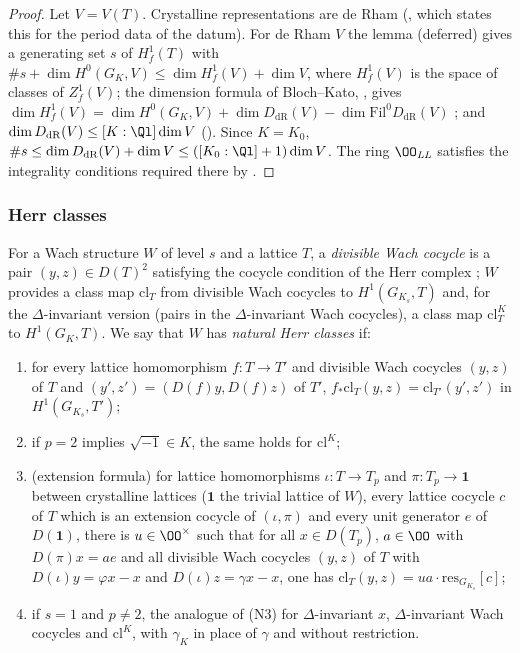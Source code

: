 \begin{proof}
Let $V=V(T)$. Crystalline representations are de Rham (, which states this for the
period data of the datum). For de Rham $V$ the lemma  (deferred) gives a generating set $s$
of $H^1_f(T)$ with $\#s+\dim H^0(G_K,V)\le\dim H^1_f(V)+\dim V$, where $H^1_f(V)$ is the space of classes of $Z^1_f(V)$; the dimension
formula of Bloch--Kato, , gives
$\dim H^1_f(V)=\dim H^0(G_K,V)+\dim D_{\mathrm{dR}}(V)-\dim\mathrm{Fil}^0D_{\mathrm{dR}}(V)$ \cite{BlochKato1990}; and
$\dim D_{\mathrm{dR}}(V)\le[K:\Ql]\dim V$ (). Since $K=K_0$,
$\#s\le\dim D_{\mathrm{dR}}(V)+\dim V\le([K_0:\Ql]+1)\dim V$. The ring $\OO_{\mathit{LL}}$ satisfies the integrality conditions required
there by .
\end{proof}

\subsubsection{Herr classes}

For a Wach structure $W$ of level $s$ and a lattice $T$, a \emph{divisible Wach cocycle} is a pair $(y,z)\in D(T)^2$ satisfying the cocycle
condition of the Herr complex \cite{Herr1998}; $W$ provides a class map $\mathrm{cl}_T$ from divisible Wach cocycles to
$H^1(G_{K_s},T)$ and, for the $\Delta$-invariant version (pairs in the $\Delta$-invariant Wach cocycles), a class map $\mathrm{cl}^K_T$ to
$H^1(G_K,T)$. We say that $W$ has \emph{natural Herr classes} if:
\begin{enumerate}[label=(N\arabic*)]
\item for every lattice homomorphism $f\colon T\to T'$ and divisible Wach cocycles $(y,z)$ of $T$ and $(y',z')=(D(f)y,D(f)z)$ of $T'$,
$f_*\mathrm{cl}_T(y,z)=\mathrm{cl}_{T'}(y',z')$ in $H^1(G_{K_s},T')$;
\item if $p=2$ implies $\sqrt{-1}\in K$, the same holds for $\mathrm{cl}^K$;
\item (extension formula) for lattice homomorphisms $\iota\colon T\to T_p$ and $\pi\colon T_p\to\mathbf 1$ between crystalline lattices ($\mathbf 1$
the trivial lattice of $W$), every lattice cocycle $c$ of $T$ which is an extension cocycle of $(\iota,\pi)$ and every unit generator $e$ of
$D(\mathbf 1)$, there is $u\in\OO^\times$ such that
for all $x\in D(T_p)$, $a\in\OO$ with $D(\pi)x=ae$ and all divisible Wach cocycles $(y,z)$ of $T$ with $D(\iota)y=\varphi x-x$ and
$D(\iota)z=\gamma x-x$, one has $\mathrm{cl}_T(y,z)=ua\cdot\mathrm{res}_{G_{K_s}}[c]$;
\item if $s=1$ and $p\ne2$, the analogue of (N3) for $\Delta$-invariant $x$, $\Delta$-invariant Wach cocycles and $\mathrm{cl}^K$, with
$\gamma_K$ in place of $\gamma$ and without restriction.
\end{enumerate}

